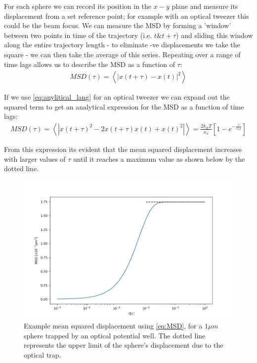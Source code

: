 For each sphere we can record its position in the $x-y$ plane and 
measure its displacement from a set reference point; for example 
with an optical tweezer this could be the beam focus. We can measure 
the MSD by forming a 'window' between two points in time of the 
trajectory (i.e. $t \&  t+\tau$) and sliding this window along the 
entire trajectory length - to eliminate -ve displacements we take 
the square - we can then take the average of this series. Repeating 
over a range of time lags allows us to describe the MSD as a function 
of $\tau$:
\begin{align}
	MSD(\tau) = \left<|x(t+\tau) - x(t)|^2\right>
\end{align}

If we use \eqref{eq:anylitical_lang} for an optical tweezer we can 
expand out the squared term to get an analytical expression for the 
MSD as a function of time lags:
\begin{align}
	\label{eq:MSD}
	MSD(\tau) = \left<|x(t+\tau)^2-2x(t+\tau)x(t)+x(t)^2|\right> = \frac{2k_BT}{\kappa_x}\left[1-e^{-\frac{\tau}{\tau_{OT}}}\right]
\end{align}

From this expression its evident that the mean squared displacement 
increases with larger values of $\tau$ until it reaches a maximum 
value as shown below by the dotted line.
\begin{figure}[h!]
	\centering
	\includegraphics[width=\linewidth]{MSD.png}
	\caption{Example mean squared displacement using \eqref{eq:MSD}, for a $1\mu m$ sphere trapped by an optical potential well. The dotted line represents the upper limit of the sphere's displacement due to the optical trap.}
\end{figure}

